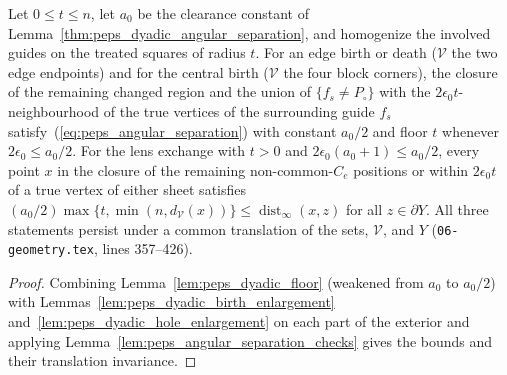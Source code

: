 \begin{lemma}
    \label{lem:peps_bulk_separation_from_floors}
    \leanok
    Let $0\le t\le n$, let $a_0$ be the clearance constant of Lemma~\ref{thm:peps_dyadic_angular_separation}, and homogenize the involved guides on the treated squares of
    radius $t$. For an edge birth or death ($\mathcal V$ the two edge endpoints) and for the central birth ($\mathcal V$ the four block corners),
    the closure of the remaining changed region and the union of $\{f_s\ne P_\circ\}$ with the $2\epsilon_0t$-neighbourhood of the true vertices of the surrounding guide $f_s$ satisfy~(\ref{eq:peps_angular_separation}) with constant
    $a_0/2$ and floor $t$ whenever $2\epsilon_0\le a_0/2$. For the lens exchange with $t>0$ and $2\epsilon_0(a_0+1)\le a_0/2$, every point $x$ in the closure of the remaining non-common-$C_e$ positions or within $2\epsilon_0t$ of
    a true vertex of either sheet satisfies
    $(a_0/2)\max\{t,\min(n,d_{\mathcal V}(x))\}\le\operatorname{dist}_\infty(x,z)$
    for all $z\in\partial Y$. All three statements persist under a common translation of
    the sets, $\mathcal V$, and $Y$ (\texttt{06-geometry.tex},
    lines 357--426).
\end{lemma}

\begin{proof}\leanok
    Combining Lemma~\ref{lem:peps_dyadic_floor} (weakened from
    $a_0$ to $a_0/2$) with Lemmas~\ref{lem:peps_dyadic_birth_enlargement} and~\ref{lem:peps_dyadic_hole_enlargement} on each part of the
    exterior and applying Lemma~\ref{lem:peps_angular_separation_checks} gives the bounds and their translation invariance.
\end{proof}

